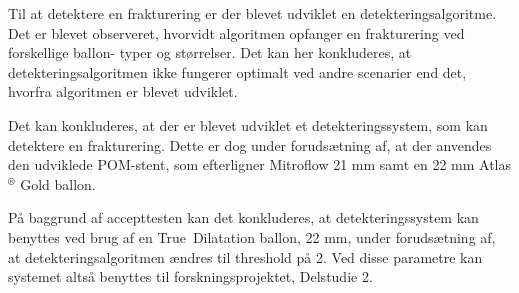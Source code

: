 Til at detektere en frakturering er der blevet udviklet en detekteringsalgoritme. Det er blevet observeret, hvorvidt algoritmen opfanger en frakturering ved forskellige ballon- typer og størrelser. Det kan her konkluderes, at detekteringsalgoritmen ikke fungerer optimalt ved andre scenarier end det, hvorfra algoritmen er blevet udviklet. 

Det kan konkluderes, at der er blevet udviklet et detekteringssystem, som kan detektere en frakturering. Dette er dog under forudsætning af, at der anvendes den udviklede POM-stent, som efterligner Mitroflow 21 mm samt en 22 mm Atlas$^\circledR$ Gold ballon.    

På baggrund af accepttesten kan det konkluderes, at detekteringssystem kan benyttes ved brug af en True\texttrademark \ Dilatation ballon, 22 mm, under forudsætning af, at detekteringsalgoritmen ændres til threshold på 2. Ved disse parametre kan systemet altså benyttes til forskningsprojektet, Delstudie 2.  




